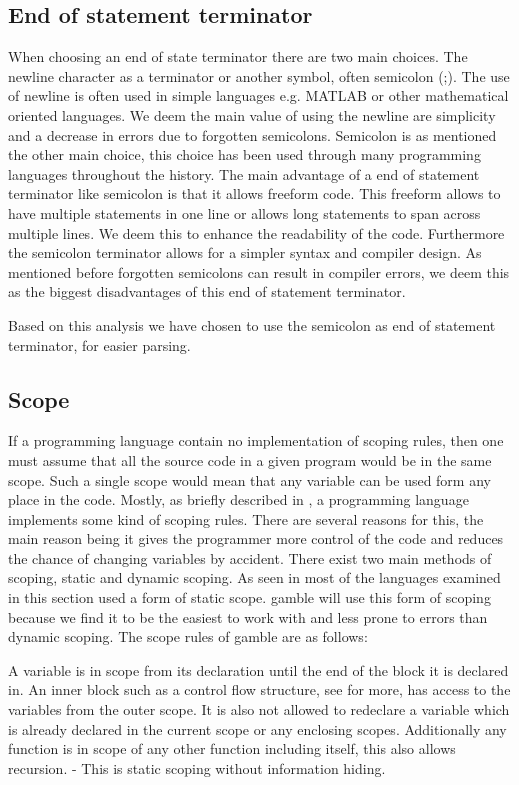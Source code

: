 \subsection*{End of statement terminator}
When choosing an end of state terminator there are two main choices.
The newline character as a terminator or another symbol, often semicolon (;).
The use of newline is often used in simple languages e.g. MATLAB or other mathematical oriented languages. 
We deem the main value of using the newline are simplicity and a decrease in errors due to forgotten semicolons.
Semicolon is as mentioned the other main choice, this choice has been used through many programming languages throughout the history. 
The main advantage of a end of statement terminator  like semicolon is that it allows freeform code. 
This freeform allows to have multiple statements in one line or allows long statements to span across multiple lines.
We deem this to enhance the readability of the code.
Furthermore the semicolon terminator allows for a simpler syntax and compiler design.
As mentioned before forgotten semicolons can result in compiler errors, we deem this as the biggest disadvantages of this end of statement terminator.

Based on this analysis we have chosen to use the semicolon as end of statement terminator, for easier parsing.

\subsection*{Scope}\label{subsec:Scope}
If a programming language contain no implementation of scoping rules, then one must assume that all the source code in a given program would be in the same scope.
Such a single scope would mean that any variable can be used form any place in the code. 
Mostly, as briefly described in , a programming language implements some kind of scoping rules.
There are several reasons for this, the main reason being it gives the programmer more control of the code and reduces the chance of changing variables by accident.
There exist two main methods of scoping, static and dynamic scoping.
As seen in  most of the languages examined in this section used a form of static scope. 
\gls{gamble} will use this form of scoping because we find it to be the easiest to work with and less prone to errors than dynamic scoping.
The scope rules of \gls{gamble} are as follows:

A variable is in scope from its declaration until the end of the block it is declared in.
An inner block such as a control flow structure, see  for more, has access to the variables from the outer scope. 
It is also not allowed to redeclare a variable which is already declared in the current scope or any enclosing scopes. 
Additionally any function is in scope of any other function including itself, this also allows recursion. 
- This is static scoping without information hiding. 

